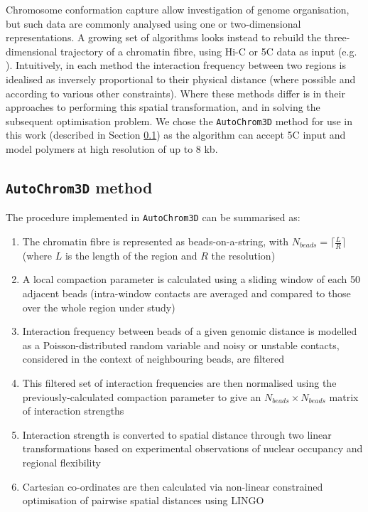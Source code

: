\documentclass[a4paper,11pt,oneside]{book}
\begin{document}
Chromosome conformation capture allow investigation of genome organisation, but such data are commonly analysed using one or two-dimensional representations. A growing set of algorithms looks instead to rebuild the three-dimensional trajectory of a chromatin fibre, using Hi-C or 5C data as input (e.g. ). Intuitively, in each method the interaction frequency between two regions is idealised as inversely proportional to their physical distance (where possible and according to various other constraints). Where these methods differ is in their approaches to performing this spatial transformation, and in solving the subsequent optimisation problem. We chose the \texttt{AutoChrom3D} method\cite{Peng2013} for use in this work (described in Section \ref{sec:achrom}) as the algorithm can accept 5C input and model polymers at high resolution of up to 8 kb.

\subsection{\texttt{AutoChrom3D} method}\label{sec:achrom}

The procedure implemented in \texttt{AutoChrom3D} can be summarised as:\cite{Peng2013}

\begin{enumerate}
\item The chromatin fibre is represented as beads-on-a-string, with $N_{beads} = \lceil\frac{L}{R}\rceil$ (where $L$ is the length of the region and $R$ the resolution)
\item A local compaction parameter is calculated using a sliding window of each 50 adjacent beads (intra-window contacts are averaged and compared to those over the whole region under study)
\item Interaction frequency between beads of a given genomic distance is modelled as a Poisson-distributed random variable and noisy or unstable contacts, considered in the context of neighbouring beads, are filtered
\item This filtered set of interaction frequencies are then normalised using the previously-calculated compaction parameter to give an $N_{beads} \times N_{beads}$ matrix of interaction strengths
\item Interaction strength is converted to spatial distance through two linear transformations based on experimental observations of nuclear occupancy and regional flexibility\cite{Kalhor2012}
\item Cartesian co-ordinates are then calculated via non-linear constrained optimisation of pairwise spatial distances using LINGO\cite{lingo}
\end{enumerate}
\end{document}
